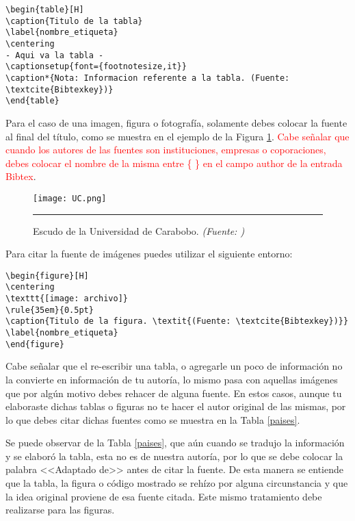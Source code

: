 \begin{lstlisting}[frame=single, float=ht]
\begin{table}[H]
\caption{Titulo de la tabla}
\label{nombre_etiqueta}
\centering
- Aqui va la tabla -
\captionsetup{font={footnotesize,it}}
\caption*{Nota: Informacion referente a la tabla. (Fuente: \textcite{Bibtexkey})}
\end{table}
\end{lstlisting}

Para el caso de una imagen, figura o fotografía, solamente debes colocar la fuente al final del título, como se muestra en el ejemplo de la Figura \ref{escudo}. \textcolor{red}{Cabe señalar que cuando los autores de las fuentes son instituciones, empresas o coporaciones, debes colocar el nombre de la misma entre \{ \} en el campo author de la entrada Bibtex}.

\begin{figure}[H]
\centering
\texttt{[image: UC.png]} 
\rule{35em}{0.5pt}
\caption{Escudo de la Universidad de Carabobo. \textit{(Fuente: \textcite{UC2015})}}
\label{escudo}
\end{figure}

Para citar la fuente de imágenes puedes utilizar el siguiente entorno:

\begin{lstlisting}[frame=single, float=ht]
\begin{figure}[H]
\centering
\texttt{[image: archivo]} 
\rule{35em}{0.5pt}
\caption{Titulo de la figura. \textit{(Fuente: \textcite{Bibtexkey})}}
\label{nombre_etiqueta}
\end{figure}
\end{lstlisting}

Cabe señalar que el re-escribir una tabla, o agregarle un poco de información no la convierte en información de tu autoría, lo mismo pasa con aquellas imágenes que por algún motivo debes rehacer de alguna fuente. En estos casos, aunque tu elaboraste dichas tablas o figuras no te hacer el autor original de las mismas, por lo que debes citar dichas fuentes como se muestra en la Tabla \ref{paises}.

Se puede observar de la Tabla \ref{paises}, que aún cuando se tradujo la información y se elaboró la tabla, esta no es de nuestra autoría, por lo que se debe colocar la palabra <<Adaptado de>> antes de citar la fuente. De esta manera se entiende que la tabla, la figura o código mostrado se rehízo por alguna circunstancia y que la idea original proviene de esa fuente citada. Este mismo tratamiento debe realizarse para las figuras.

